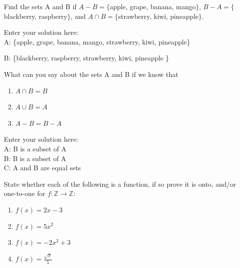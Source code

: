 \documentclass[10pt]{exam}
\begin{document}
\begin{questions}
\question[6] Find the sets A and B if $A - B = \{$apple, grape, banana, mango$\}$, $B - A = \{$blackberry, raspberry$\}$, and $A \cap B = \{$strawberry, kiwi, pineapple$\}$.

\begin{solution}
    Enter your solution here: \\
    A: \{apple, grape, banana, mango, strawberry, kiwi, pineapple\}
    
    B: \{blackberry, raspberry, strawberry, kiwi, pineapple \}
\end{solution}

\question[6] What can you say about the sets A and B if we know that
\begin{enumerate} [label=(\alph*)]
    \item $A \cap B = B$
    \item $A \cup B = A$
    \item $A - B = B - A$
\end{enumerate}

\begin{solution}
    Enter your solution here: \\
    A: B is a subset of A\\
    B: B is a subset of A\\
    C: A and B are equal sets
\end{solution}

\question[20] State whether each of the following is a function, if so prove it is onto, and/or one-to-one for $f: \mathbb{Z} \rightarrow \mathbb{Z}$:
\begin{enumerate} [label=(\alph*)]
    \item $f(x) = 2x - 3$
    \item $f(x) = 5x^2$
    \item $f(x) = -2x^2+3$
    \item $f(x) = \frac{\sqrt{x}}{5}$
\end{enumerate}


\end{questions}
\end{document}
